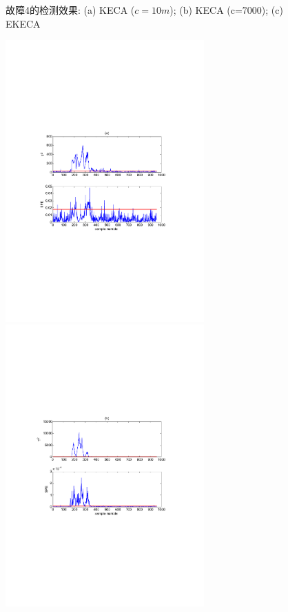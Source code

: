 \begin{figure}[!htb]
  \caption{故障4的检测效果: (a) KECA ($c=10m$); (b) KECA (c=7000); (c) EKECA}\label{fault4}
  \vspace*{-0.4cm}
\end{figure}
\begin{figure}[!htb]
  \centering
   \includegraphics[width=3in]{./Pictures/5-1.pdf}
  \includegraphics[width=3in]{./Pictures/5-2.pdf}

\end{figure}
